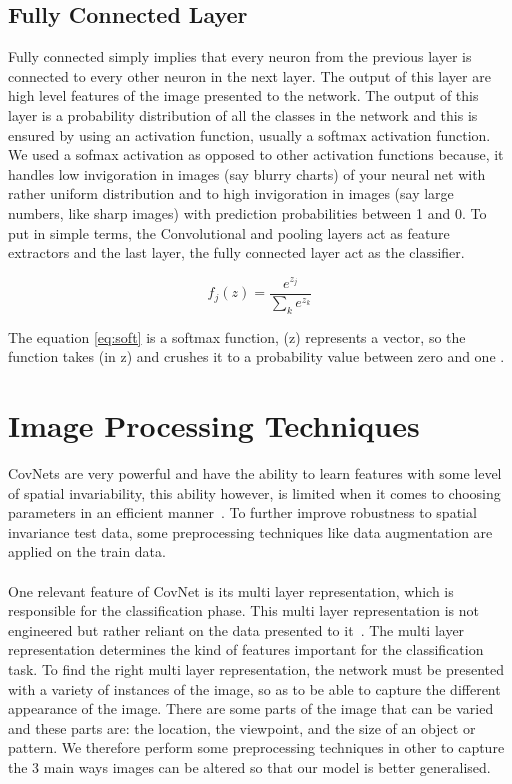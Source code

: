\documentclass[12pt, a4paper,oneside]{report}
\begin{document}
\subsection{Fully Connected Layer}
Fully connected simply implies that every neuron from the previous layer is connected to every other neuron in the next layer. The output of this layer are high level features of the image presented to the network. The output of this layer is a probability distribution of all the classes in the network and this is ensured by using an activation function, usually a softmax activation function. We used a sofmax activation as opposed to other activation functions because, it handles low invigoration in images (say blurry charts) of your neural net with rather uniform distribution and to high invigoration in images (say large numbers, like sharp images) with prediction probabilities between 1 and 0. To put in simple terms, the Convolutional and pooling layers act as feature extractors and the last layer, the fully connected layer act as the classifier.

\begin{equation} \label{eq:soft}
f_j(z) = \frac{e^{z_j}}{\sum_k e^{z_k}}
\end{equation}

The equation \ref{eq:soft} is a softmax function, (z) represents a vector, so the function takes (in z) and crushes it to a probability value between zero and one \cite{softmax}.

\section{Image Processing Techniques}
CovNets are very powerful and have the ability to learn features with some level of spatial invariability, this ability however, is limited when it comes to choosing parameters in an efficient manner~\cite{jaderberg2015spatial}. To further improve robustness to spatial invariance test data, some preprocessing techniques like data augmentation are applied on the train data.\\ \\ One relevant feature of CovNet is its multi layer representation, which is responsible for the classification phase. This multi layer representation is not engineered but rather reliant on the data presented to it~\cite{van2017learning}. The multi layer representation determines the kind of features important for the classification task. To find the right multi layer representation, the network must be presented with a variety of instances of the image, so as to be able to capture the different appearance of the image. There are some parts of the image that can be varied and these parts are: the location, the viewpoint, and the size of an object or pattern. We therefore perform some preprocessing techniques in other to capture the 3 main ways images can be altered so that our model is better generalised. 
\end{document}
